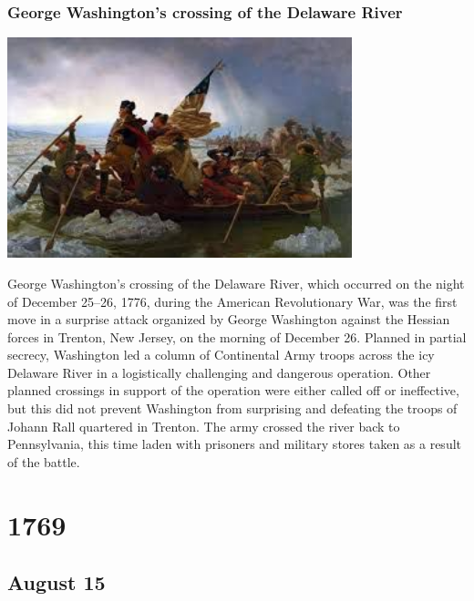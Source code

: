 \documentclass[11pt]{report}
\begin{document}
\subsection{George Washington's crossing of the Delaware River}
\vspace{2mm}\begin{center}\includegraphics[width=10cm]{./img/crossingDelaware.jpg}\end{center}
George Washington's crossing of the Delaware River, which occurred on the night of December 25–26, 1776, during the American Revolutionary War, was the first move in a surprise attack organized by George Washington against the Hessian forces in Trenton, New Jersey, on the morning of December 26. Planned in partial secrecy, Washington led a column of Continental Army troops across the icy Delaware River in a logistically challenging and dangerous operation. Other planned crossings in support of the operation were either called off or ineffective, but this did not prevent Washington from surprising and defeating the troops of Johann Rall quartered in Trenton. The army crossed the river back to Pennsylvania, this time laden with prisoners and military stores taken as a result of the battle.

\chapter{1769}
\section{August 15}
\end{document}
